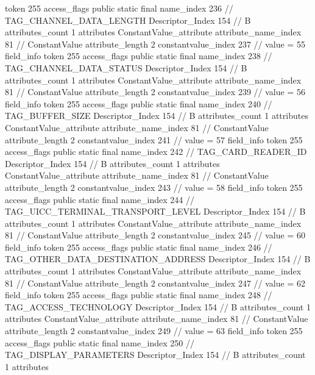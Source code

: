 {{{{{				token	255
				access_flags	public static final
				name_index	236		// TAG_CHANNEL_DATA_LENGTH
				Descriptor_Index	154		// B
				attributes_count	1
				attributes {
				ConstantValue_attribute {
					attribute_name_index	81		// ConstantValue
					attribute_length	2
					constantvalue_index	237		// value = 55
				}
				}
			}
			field_info {
				token	255
				access_flags	public static final
				name_index	238		// TAG_CHANNEL_DATA_STATUS
				Descriptor_Index	154		// B
				attributes_count	1
				attributes {
				ConstantValue_attribute {
					attribute_name_index	81		// ConstantValue
					attribute_length	2
					constantvalue_index	239		// value = 56
				}
				}
			}
			field_info {
				token	255
				access_flags	public static final
				name_index	240		// TAG_BUFFER_SIZE
				Descriptor_Index	154		// B
				attributes_count	1
				attributes {
				ConstantValue_attribute {
					attribute_name_index	81		// ConstantValue
					attribute_length	2
					constantvalue_index	241		// value = 57
				}
				}
			}
			field_info {
				token	255
				access_flags	public static final
				name_index	242		// TAG_CARD_READER_ID
				Descriptor_Index	154		// B
				attributes_count	1
				attributes {
				ConstantValue_attribute {
					attribute_name_index	81		// ConstantValue
					attribute_length	2
					constantvalue_index	243		// value = 58
				}
				}
			}
			field_info {
				token	255
				access_flags	public static final
				name_index	244		// TAG_UICC_TERMINAL_TRANSPORT_LEVEL
				Descriptor_Index	154		// B
				attributes_count	1
				attributes {
				ConstantValue_attribute {
					attribute_name_index	81		// ConstantValue
					attribute_length	2
					constantvalue_index	245		// value = 60
				}
				}
			}
			field_info {
				token	255
				access_flags	public static final
				name_index	246		// TAG_OTHER_DATA_DESTINATION_ADDRESS
				Descriptor_Index	154		// B
				attributes_count	1
				attributes {
				ConstantValue_attribute {
					attribute_name_index	81		// ConstantValue
					attribute_length	2
					constantvalue_index	247		// value = 62
				}
				}
			}
			field_info {
				token	255
				access_flags	public static final
				name_index	248		// TAG_ACCESS_TECHNOLOGY
				Descriptor_Index	154		// B
				attributes_count	1
				attributes {
				ConstantValue_attribute {
					attribute_name_index	81		// ConstantValue
					attribute_length	2
					constantvalue_index	249		// value = 63
				}
				}
			}
			field_info {
				token	255
				access_flags	public static final
				name_index	250		// TAG_DISPLAY_PARAMETERS
				Descriptor_Index	154		// B
				attributes_count	1
				attributes {
}}}}}}
